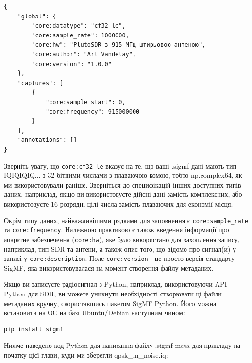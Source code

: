 \begin{Verbatim}[breaklines=true,breakanywhere=true,fontsize=\small]
{
    "global": {
        "core:datatype": "cf32_le",
        "core:sample_rate": 1000000,
        "core:hw": "PlutoSDR з 915 МГц штирьовою антеною",
        "core:author": "Art Vandelay",
        "core:version": "1.0.0"
    },
    "captures": [
        {
            "core:sample_start": 0,
            "core:frequency": 915000000
        }
    ],
    "annotations": []
}
\end{Verbatim}

Зверніть увагу, що \texttt{core:cf32\_le} вказує на те, що ваші
.sigmf-дані мають тип IQIQIQIQ... з 32-бітними числами з плаваючою
комою, тобто np.complex64, як ми використовували раніше. Зверніться до
специфікацій інших доступних типів даних, наприклад, якщо ви
використовуєте дійсні дані замість комплексних, або використовуєте
16-розрядні цілі числа замість плаваючих для економії місця.

Окрім типу даних, найважливішими рядками для заповнення є
\texttt{core:sample\_rate} та \texttt{core:frequency}. Належною
практикою є також введення інформації про апаратне забезпечення
(\texttt{core:hw}), яке було використано для захоплення запису,
наприклад, тип SDR та антени, а також опис того, що відомо про сигнал(и)
у записі у \texttt{core:description}. Поле \texttt{core:version} - це
просто версія стандарту SigMF, яка використовувалася на момент створення
файлу метаданих.

Якщо ви записуєте радіосигнал з Python, наприклад, використовуючи API
Python для SDR, ви можете уникнути необхідності створювати ці файли
метаданих вручну, скориставшись пакетом SigMF Python. Його можна
встановити на ОС на базі Ubuntu/Debian наступним чином:

\begin{Verbatim}[breaklines=true,breakanywhere=true,fontsize=\small]
pip install sigmf
\end{Verbatim}

Нижче наведено код Python для написання файлу .sigmf-meta для прикладу
на початку цієї глави, куди ми зберегли qpsk\_in\_noise.iq:

